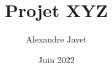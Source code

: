 \documentclass[12pt, letterpaper, twoside]{article}
\title{Projet XYZ}
\author{Alexandre Javet}
\date{Juin 2022}
\begin{document}
\maketitle

\pagebreak

\tableofcontents
	
\end{document}
